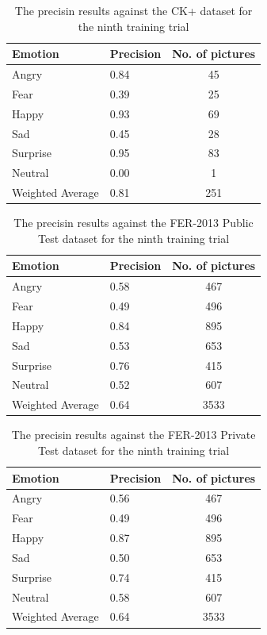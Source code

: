 \documentclass[runningheads,a4paper,11pt]{report}
\begin{document}
\begin{table}[htbp]
	\caption{The precisin results against the CK+ dataset for the ninth training trial}
	\label{fer_training_28k_01_mean_square_filtered_ckp}
		\begin{center}
			\begin{tabular}{p{110pt}p{110pt}c}
				\textbf{Emotion}& \textbf{Precision}& \textbf{No. of pictures} \\
				\hline\hline
				Angry& 0.84& 45 \\
				Fear& 0.39& 25 \\
				Happy& 0.93& 69 \\
				Sad& 0.45& 28 \\
				Surprise& 0.95& 83 \\
				Neutral& 0.00& 1 \\
				\hline
				Weighted Average& 0.81& 251
			\end{tabular}
		\end{center}
\end{table}
\begin{table}[htbp]
	\caption{The precisin results against the FER-2013 Public Test dataset for the ninth training trial}
	\label{fer_training_28k_01_mean_square_filtered_public_test}
		\begin{center}
			\begin{tabular}{p{110pt}p{110pt}c}
				\textbf{Emotion}& \textbf{Precision}& \textbf{No. of pictures} \\
				\hline\hline
				Angry& 0.58& 467 \\
				Fear& 0.49& 496 \\
				Happy& 0.84& 895 \\
				Sad& 0.53& 653 \\
				Surprise& 0.76& 415 \\
				Neutral& 0.52& 607 \\
				\hline
				Weighted Average& 0.64 &3533
			\end{tabular}
		\end{center}
\end{table}
\begin{table}[htbp]
	\caption{The precisin results against the FER-2013 Private Test dataset for the ninth training trial}
	\label{fer_training_28k_01_mean_square_filtered_private_test}
		\begin{center}
			\begin{tabular}{p{110pt}p{110pt}c}
				\textbf{Emotion}& \textbf{Precision}& \textbf{No. of pictures} \\
				\hline\hline
				Angry& 0.56& 467 \\
				Fear& 0.49& 496 \\
				Happy& 0.87& 895 \\
				Sad& 0.50& 653 \\
				Surprise& 0.74& 415 \\
				Neutral& 0.58& 607 \\
				\hline
				Weighted Average& 0.64 &3533
			\end{tabular}
		\end{center}
\end{table}
\end{document}
